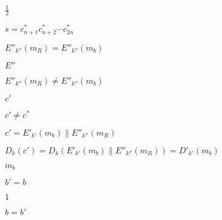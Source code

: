 \documentclass[10pt]{book}
\begin{document}
\begin{mdSnippets}
\begin{mdInlineSnippet}[93b05c90d14a117ba52da1d743a43ab1]
$\frac{1}{2}$\end{mdInlineSnippet}%
\begin{mdInlineSnippet}%
$s =  c^*_{n+1}c^*_{n+2} \cdots c^*_{2n}$\end{mdInlineSnippet}%
\begin{mdInlineSnippet}%
$E''_{k''}(m_R) = E''_{k''}(m_b)$\end{mdInlineSnippet}%
\begin{mdInlineSnippet}[a7ed12761a180ae1177b6afbbf39d3b3]%
$E''$\end{mdInlineSnippet}%
\begin{mdInlineSnippet}[12215d54b5fa5b29532493e7a1ef33d4]%
$E''_{k''}(m_R) \neq E''_{k''}(m_b)$\end{mdInlineSnippet}%
\begin{mdInlineSnippet}[12c7acffa10294560a339fa9f4796b80]%
$c'$\end{mdInlineSnippet}%
\begin{mdInlineSnippet}[524330cee1943c719d608d0905e402f6]%
$c' \neq c^*$\end{mdInlineSnippet}%
\begin{mdInlineSnippet}[43c9c4e173e438165739e9dc419b24c9]%
$c' = E'_{k'}(m_b) \| E''_{k''}(m_R)$\end{mdInlineSnippet}%
\begin{mdInlineSnippet}[cb483329e2bd124c7ea7f80bb5efcdbc]%
$D_k(c') = D_k(E'_{k'}(m_b) \| E''_{k''}(m_R)) = D'_{k'}(m_b)$\end{mdInlineSnippet}%
\begin{mdInlineSnippet}[7960e7402c420dc1ba0324867807f1f6]%
$m_b$\end{mdInlineSnippet}%
\begin{mdInlineSnippet}[8ecedbf9a59024f22c6305b014c57828]%
$b' = b$\end{mdInlineSnippet}%
\begin{mdInlineSnippet}[c4ca4238a0b923820dcc509a6f75849b]%
$1$\end{mdInlineSnippet}%
\begin{mdInlineSnippet}[2b6e49448e7d732421cbac8655e4f76a]%
$b = b'$\end{mdInlineSnippet}%

\end{mdSnippets}
\end{document}
